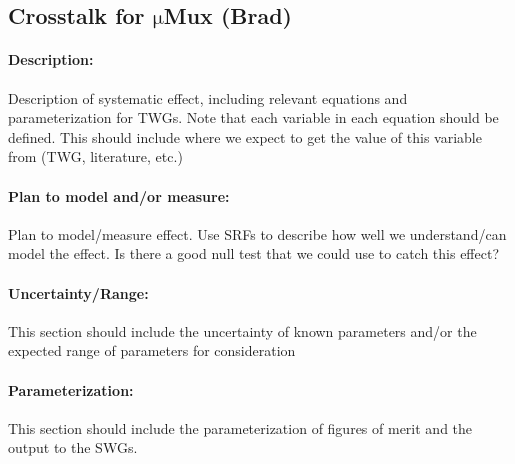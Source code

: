 \subsection{Crosstalk for $\mathrm{\mu}$Mux (Brad)}

\paragraph{Description:}
Description of systematic effect, including relevant equations and
parameterization for TWGs. Note that each variable in each equation should be
defined. This should include where we expect to get the value of this variable
from (TWG, literature, etc.)

\paragraph{Plan to model and/or measure:}
Plan to model/measure effect. Use SRFs to describe how well we understand/can model the effect. Is there a good null test that we could use to catch this effect?

\paragraph{Uncertainty/Range:}
This section should include the uncertainty of
known parameters and/or the expected range of parameters for consideration

\paragraph{Parameterization:}
This section should include the parameterization of figures of
merit and the output to the SWGs.
